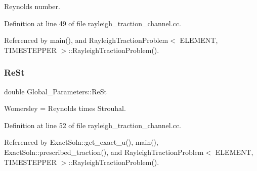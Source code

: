 Reynolds number. 



Definition at line 49 of file rayleigh\+\_\+traction\+\_\+channel.\+cc.



Referenced by main(), and Rayleigh\+Traction\+Problem$<$ E\+L\+E\+M\+E\+N\+T, T\+I\+M\+E\+S\+T\+E\+P\+P\+E\+R $>$\+::\+Rayleigh\+Traction\+Problem().

\mbox{\label{namespaceGlobal__Parameters_a7a59a32365e87566069e458dc83bd18a}} 
\subsubsection{\texorpdfstring{Re\+St}{ReSt}}
{\footnotesize\ttfamily double Global\+\_\+\+Parameters\+::\+Re\+St}



Womersley = Reynolds times Strouhal. 



Definition at line 52 of file rayleigh\+\_\+traction\+\_\+channel.\+cc.



Referenced by Exact\+Soln\+::get\+\_\+exact\+\_\+u(), main(), Exact\+Soln\+::prescribed\+\_\+traction(), and Rayleigh\+Traction\+Problem$<$ E\+L\+E\+M\+E\+N\+T, T\+I\+M\+E\+S\+T\+E\+P\+P\+E\+R $>$\+::\+Rayleigh\+Traction\+Problem().

